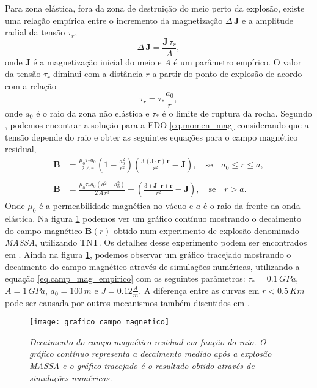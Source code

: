 Para zona el\'astica, fora da zona de destrui\c{c}\~ao do meio perto da explos\~ao, existe uma rela\c{c}\~ao emp\'irica entre o incremento da magnetiza\c{c}\~ao $\Delta\,\mathbf{J}$ e a amplitude radial da tens\~ao $\tau_r$,
\begin{equation}\label{eq.momen_mag}
\Delta\,\mathbf{J}=\frac{\mathbf{J}\,\tau_r}{A},
\end{equation}
onde $\mathbf{J}$ \'e a magnetiza\c{c}\~ao inicial do meio e $A$ \'e um par\^ametro emp\'irico. O valor da tens\~ao $\tau_r$ diminui com a dist\^ancia $r$ a partir do ponto de explos\~ao de acordo com a rela\c{c}\~ao
\begin{equation}
\tau_r=\tau_*\frac{a_0}{r},
\end{equation}
onde $a_0$ \'e o raio da zona n\~ao el\'astica e $\tau_*$ \'e o limite de ruptura da rocha. Segundo \cite{surkov_89a}, podemos encontrar a solu\c{c}\~ao para a EDO \ref{eq.momen_mag} considerando que a tens\~ao depende do raio e obter as seguintes equa\c{c}\~oes para o campo magn\'etico residual,
\begin{align}\label{eq.camp_mag_empirico}
\mathbf{B}&=\frac{\mu_0\tau_*a_0}{2\,A\,r}\left(1-\frac{a_0^2}{r^2}\right)\left(\frac{3\,(\mathbf{J}\cdot \mathbf{r})\,\mathbf{r}}{r^2}-\mathbf{J}\right),\quad\text{se}\quad a_0\leq r\leq a,\\\nonumber\\
\mathbf{B}&=\frac{\mu_0\tau_*a_0(a^2-a_0^2)}{2\,A\,r^3}-\left(\frac{3\,(\mathbf{J}\cdot \mathbf{r})\,\mathbf{r}}{r^2}-\mathbf{J}\right),\quad\text{se}\quad r>a.
\end{align}
Onde $\mu_0$ \'e a permeabilidade magn\'etica no v\'acuo e $a$ \'e o raio da frente da onda el\'astica. Na figura \ref{fig.decai_camp_mag} podemos ver um gr\'afico cont\'inuo mostrando o decaimento do campo magn\'etico $\mathbf{B}(r)$ obtido num experimento de explos\~ao denominado \textit{MASSA}, utilizando TNT. Os detalhes desse experimento podem ser encontrados em \cite{yerzhanov_85}. Ainda na figura \ref{fig.decai_camp_mag}, podemos observar um gr\'afico tracejado mostrando o decaimento do campo magn\'etico atrav\'es de simula\c{c}\~oes num\'ericas, utilizando a equa\c{c}\~ao \ref{eq.camp_mag_empirico} com os seguintes par\^ametros: $\tau_*=0.1\,GPa$, $A=1\,GPa$, $a_0=100\,m$ e $J=0.12\frac{A}{m}$. A diferen\c{c}a entre as curvas em $r<0.5\,Km$ pode ser causada por outros mecanismos tamb\'em discutidos em \cite{surkov_97}.
\begin{figure}
\centering
\texttt{[image: grafico\_campo\_magnetico]}
\caption{\textit{Decaimento do campo magn\'etico residual em fun\c{c}\~ao do raio. O gr\'afico cont\'inuo representa a decaimento medido ap\'os a explos\~ao MASSA e o gr\'afico tracejado \'e o resultado obtido atrav\'es de simula\c{c}\~oes num\'ericas.}}
\label{fig.decai_camp_mag}
\end{figure}

